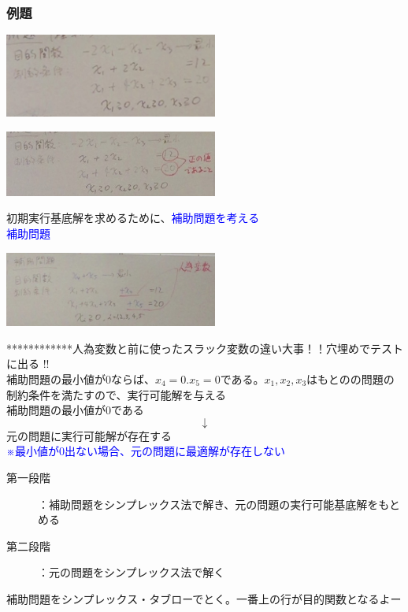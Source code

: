 \documentclass{jsarticle}
\begin{document}
{{{\subsubsection{例題}
	\begin{center}
		\includegraphics[width=7cm]{1_7_1.JPG}
	\end{center}
	\begin{center}
		\includegraphics[width=7cm]{1_7_2.JPG}
	\end{center}
	初期実行基底解を求めるために、\textcolor{blue}{補助問題を考える}\\
	{\textcolor{blue}{\Large{補助問題}}}\\
	\begin{center}
		\includegraphics[width=7cm]{1_7_3.JPG}
	\end{center}
	************人為変数と前に使ったスラック変数の違い大事！！穴埋めでテストに出る !!\\
	補助問題の最小値が$0$ならば、$x_4=0.x_5=0$である。$x_1,x_2,x_3$はもとのの問題の制約条件を満たすので、実行可能解を与える\\
	補助問題の最小値が0である\\
	\[↓\]
	元の問題に実行可能解が存在する\\
	\textcolor{blue}{※最小値が0出ない場合、元の問題に最適解が存在しない}\\
	\begin{description}
		\item[第一段階]：補助問題をシンプレックス法で解き、元の問題の実行可能基底解をもとめる
		\item[第二段階]：元の問題をシンプレックス法で解く
	\end{description}
	補助問題をシンプレックス・タブローでとく。一番上の行が目的関数となるよー
}}}
\end{document}
